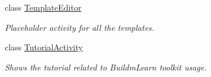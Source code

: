 \begin{DoxyCompactItemize}
class \hyperlink{classorg_1_1buildmlearn_1_1toolkit_1_1activity_1_1TemplateEditor}{Template\-Editor}
\begin{DoxyCompactList}\small\item\em Placeholder activity for all the templates. \end{DoxyCompactList}\item 
class \hyperlink{classorg_1_1buildmlearn_1_1toolkit_1_1activity_1_1TutorialActivity}{Tutorial\-Activity}
\begin{DoxyCompactList}\small\item\em Shows the tutorial related to Buildm\-Learn toolkit usage. \end{DoxyCompactList}\end{DoxyCompactItemize}
